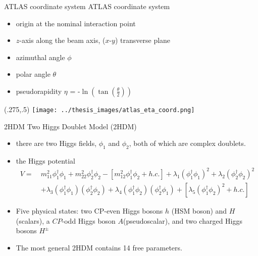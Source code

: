 \documentclass[10pt,UKenglish, leqno, xcolor = dvipsnames]{beamer}
\begin{document}
		\begin{frame}{ATLAS coordinate system}
			\vspace{.2cm}
			ATLAS coordinate system
			\begin{itemize}
				\item origin at the nominal interaction point
				\item $z$-axis along the beam axis, ($x$-$y$) transverse plane
				\item azimuthal angle $\phi$
				\item polar angle $\theta$
				\item pseudorapidity $\eta$ = -$\ln(\tan(\frac{\theta}{2}))$
			\end{itemize}
			\begin{textblock}{1}(.275,.5)
				\texttt{[image: ../thesis\_images/atlas\_eta\_coord.png]}	
			\end{textblock}
			
		\end{frame}
	
		\begin{frame}{2HDM}
			\vfill
			Two Higgs Doublet Model (2HDM)
			\begin{itemize}
				\item there are two Higgs fields, $\phi_1$ and $\phi_2$, both of which are complex doublets.
				\item the Higgs potential
				\begin{equation*}\begin{split}
						V =\ & m^2_{11}\phi_1^{\dagger}\phi_1 + m^2_{22}\phi_2^{\dagger}\phi_2 - [m^2_{12}\phi_1^{\dagger}\phi_2 + h.c.] +
						\lambda_1(\phi_1^{\dagger}\phi_1)^2 + \lambda_2(\phi_2^{\dagger}\phi_2)^2\\ & + \lambda_3(\phi_1^{\dagger}\phi_1)(\phi_2^{\dagger}\phi_2) + \lambda_4(\phi_1^{\dagger}\phi_2)(\phi_2^{\dagger}\phi_1) + [\lambda_5(\phi_1^{\dagger}\phi_2)^2 + h.c.]
				\end{split}\end{equation*}
				\item  Five physical states: two CP-even Higgs bosons $h$ (HSM boson) and $H$ (scalars), a $CP$-odd Higgs boson $A $(pseudoscalar), and two charged Higgs bosons $H^{\pm}$
				\item The most general 2HDM contains 14 free parameters.
			\end{itemize}
			\vfill
		\end{frame}
	
\end{document}
